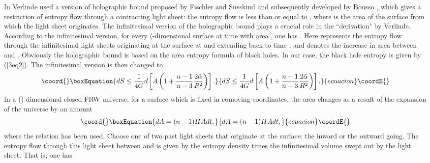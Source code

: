 \documentclass[a4paper,12pt]{article}
\begin{document}
In \cite{Verl} Verlinde used a version of holographic bound proposed by Fischler and
Susskind \cite{FS} and subsequently developed by Bousso \cite{Bous}, which gives a
restriction of entropy flow
\coordHE{} through a contracting light sheet: the entropy flow \coordHE{} is less than or equal to \coordHE{},
where \coordHE{} is the area of the surface from which the light sheet originates.  The
infinitesimal version of the holographic bound plays a crucial role in the ``derivation"
by Verlinde.  According to the infinitesimal version, for every (\coordHE{}-dimensional
surface at time \coordHE{} with area \coordHE{}, one has \coordHE{}. Here \coordHE{} represents
the entropy flow through the infinitesimal light sheets originating  at the surface
at \coordHE{} and extending back to time \coordHE{}, and \coordHE{} denotes the increase in area
between \coordHE{} and \coordHE{}. Obviously the
holographic bound is based on the area entropy formula of black holes. In our case,
the black hole entropy is given by (\ref{3eq2}). The infinitesimal version  is then
 changed to
\begin{equation}\coord{}\boxEquation{
\label{3eq3}
dS \le \frac{1}{4G}d\left[ A \left( 1 +\frac{n-1}{n-3}\frac{2\tilde \alpha }{R^2}\right)
  \right].
}{
dS \le \frac{1}{4G}d\left[ A \left( 1 +\frac{n-1}{n-3}\frac{2\tilde \alpha }{R^2}\right)
  \right].
}{ecuacion}\coordE{}\end{equation}
In a (\coordHE{}) dimensional closed FRW universe, for a surface which is fixed in comoving
coordinates,  the area \coordHE{} changes as a result of the expansion of the universe by
 an amount
\begin{equation}\coord{}\boxEquation{
\label{3eq4}
dA =(n-1)HA dt,
}{
dA =(n-1)HA dt,
}{ecuacion}\coordE{}\end{equation}
where the relation \coordHE{} has been used.  Choose one of two past light sheets
that originate at the surface: the inward or the outward going. The entropy flow through
this light sheet between \coordHE{} and \coordHE{} is given by the entropy density \coordHE{} times the
infinitesimal volume \coordHE{} swept out by the light sheet. That is, one has
\end{document}
